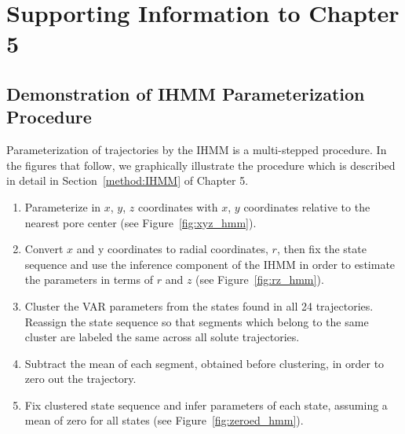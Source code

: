 \chapter{Supporting Information to Chapter 5}\label{SI:ch5}
  
  \section{Demonstration of IHMM Parameterization Procedure}\label{section:ihmm_procedure}
  
  Parameterization of trajectories by the IHMM is a multi-stepped procedure. In the figures
  that follow, we graphically illustrate the procedure which is described in detail in
  Section~\ref{method:IHMM} of Chapter 5.
  
  \begin{enumerate}
  	\item Parameterize in $x$, $y$, $z$ coordinates with $x$, $y$ coordinates relative to the nearest
  	pore center (see Figure~\ref{fig:xyz_hmm}). 	
  	\item Convert $x$ and y coordinates to radial coordinates, $r$, then fix the state sequence
  	and use the inference component of the IHMM in order to estimate the parameters in terms
  	of $r$ and $z$ (see Figure~\ref{fig:rz_hmm}). 	 	
  	\item Cluster the VAR parameters from the states found in all 24 trajectories. Reassign the state
  	sequence so that segments which belong to the same cluster are labeled the same across all solute
  	trajectories.
  	\item Subtract the mean of each segment, obtained before clustering, in order to zero out the
  	trajectory.
  	\item Fix clustered state sequence and infer parameters of each state, assuming a mean of zero
  	for all states (see Figure~\ref{fig:zeroed_hmm}). 
  \end{enumerate}
  
